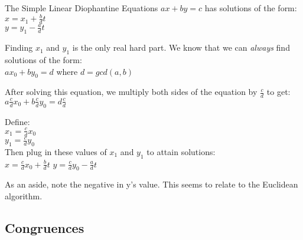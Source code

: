 \documentclass{article}
\begin{document}
The Simple Linear Diophantine Equations $ax + by = c$ has solutions of the form:\\
  $ x = x_1 + \frac{b}{d} t $\\
  $ y = y_1 - \frac{a}{d} t $

  Finding $x_1$ and $y_1$ is the only real hard part. We know that we can \emph{always} find solutions of the form: \\
  $ a x_0 + b y_0 = d $ where $d = gcd(a, b)$

  After solving this equation, we multiply both sides of the equation by $\frac{c}{d}$ to get:
  $ a \frac{c}{d} x_0 + b \frac{c}{d} y_0 = d \frac{c}{d} $

  Define: \\
  $ x_1 = \frac{c}{d} x_0 $ \\
  $ y_1 = \frac{c}{d} y_0 $ \\

  Then plug in these values of $x_1$ and $y_1$ to attain solutions: \\
  $ x = \frac{c}{d} x_0 + \frac{b}{d} t $
  $ y = \frac{c}{d} y_0 - \frac{a}{d} t $

  As an aside, note the negative in y's value. This seems to relate to the Euclidean algorithm.


  \pagebreak
  \subsection{Congruences}
\end{document}
